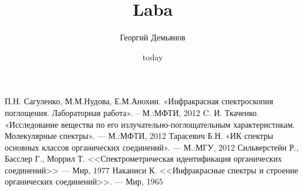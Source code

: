 \documentclass[a4paper,12pt]{article}
\title{Laba}
\author{Георгий Демьянов}
\date{today}
\begin{document}

\tableofcontents
\clearpage






\begin{thebibliography}{1}
		П.Н. Сагуленко, М.М.Нудова, Е.М.Анохин. «Инфракрасная спектроскопия поглощения. Лабораторная работа». – М.:МФТИ, 2012
		C. И. Ткаченко. «Исследование вещества по его излучательно-поглощательным характеристикам. Молекулярные спектры». --- М.:МФТИ, 2012
		Тарасевич Б.Н. «ИК спектры основных классов органических
		соединений». --- М.:МГУ, 2012
		Сильверстейн Р., Басслер Г., Моррил Т. <<Спектрометрическая идентификация органических соединений>> --- Мир, 1977
		Наканиси К. <<Инфракрасные спектры и строение органических соединений>>. --- Мир, 1965
\end{thebibliography}
%
%
\end{document}
